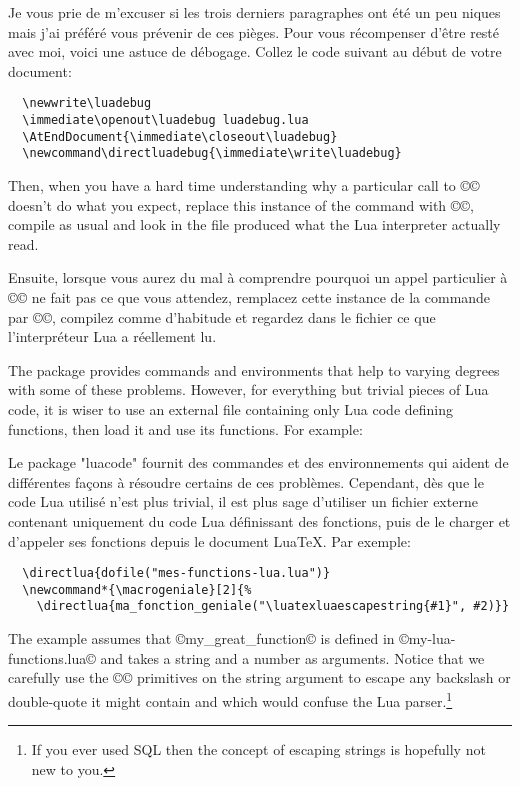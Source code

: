 \documentclass{lltxdoc}
\begin{document}
Je vous prie de m'excuser si les trois derniers paragraphes ont été un peu \tex{}niques mais j'ai préféré vous prévenir de ces pièges. Pour vous récompenser d'être resté avec moi, voici une astuce de débogage. Collez le code suivant au début de votre document:
\begin{Verbatim}
  \newwrite\luadebug
  \immediate\openout\luadebug luadebug.lua
  \AtEndDocument{\immediate\closeout\luadebug}
  \newcommand\directluadebug{\immediate\write\luadebug}
\end{Verbatim}
Then, when you have a hard time understanding why a particular call to
©\directlua© doesn't do what you expect, replace this instance of the command
with ©\directluadebug©, compile as usual and look in the file
 produced what the Lua interpreter actually read.

Ensuite, lorsque vous aurez du mal à comprendre pourquoi un appel particulier à ©\directlua© ne fait pas ce que vous attendez, remplacez cette instance de la commande par ©\directluadebug©, compilez comme d'habitude et regardez dans le fichier  ce que l'interpréteur Lua a réellement lu.

The  package provides commands and environments that help to
varying degrees with some of these problems. However, for everything but
trivial pieces of Lua code, it is wiser to use an external file containing
only Lua code defining functions, then load it and use its functions. For
example:

Le package "luacode" fournit des commandes et des environnements qui aident de différentes façons à résoudre certains de ces problèmes. Cependant, dès que le code Lua utilisé n'est plus trivial, il est plus sage d'utiliser un fichier externe contenant uniquement du code Lua définissant des fonctions, puis de le charger et d'appeler ses fonctions depuis le document LuaTeX. Par exemple:
\begin{Verbatim}
  \directlua{dofile("mes-functions-lua.lua")}
  \newcommand*{\macrogeniale}[2]{%
    \directlua{ma_fonction_geniale("\luatexluaescapestring{#1}", #2)}}
\end{Verbatim}
The example assumes that ©my_great_function© is defined in
©my-lua-functions.lua© and takes a string and a number as arguments. Notice
that we carefully use the ©\luatexluaescapestring© primitives on the string
argument to escape any backslash or double-quote it might contain and which
would confuse the Lua parser.\footnote{If you ever used SQL then the concept
  of escaping strings is hopefully not new to you.}
\end{document}
